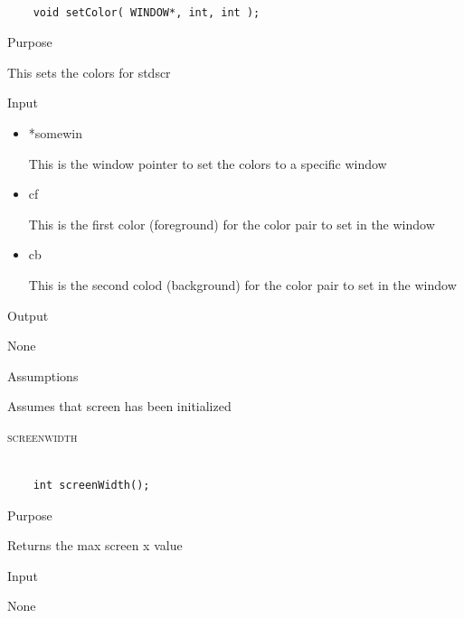 \documentclass[pdftex, 11pt]{article}
\begin{document}
\begin{description}
		\begin{lstlisting}

	void setColor( WINDOW*, int, int );
		\end{lstlisting}

		\begin{description}
			\item{Purpose}

				This sets the colors for stdscr

			\item{Input}

				\begin{itemize}

					\item{*somewin}

						This is the window pointer to set
						the colors to a specific window

					\item{cf}

						This is the first color (foreground)
						for the color pair to set in the window

					\item{cb}

						This is the second colod (background)
						for the color pair to set in the window
						
				\end{itemize}	

			\item{Output}

				None

			\item{Assumptions}

				Assumes that screen has been initialized

		\end{description}


	\item{\textsc{screenwidth}}

		\begin{lstlisting}

	int screenWidth();
		\end{lstlisting}

		\begin{description}
			\item{Purpose}

				Returns the max screen x value 

			\item{Input}

				None


\end{description}
\end{description}
\end{document}

